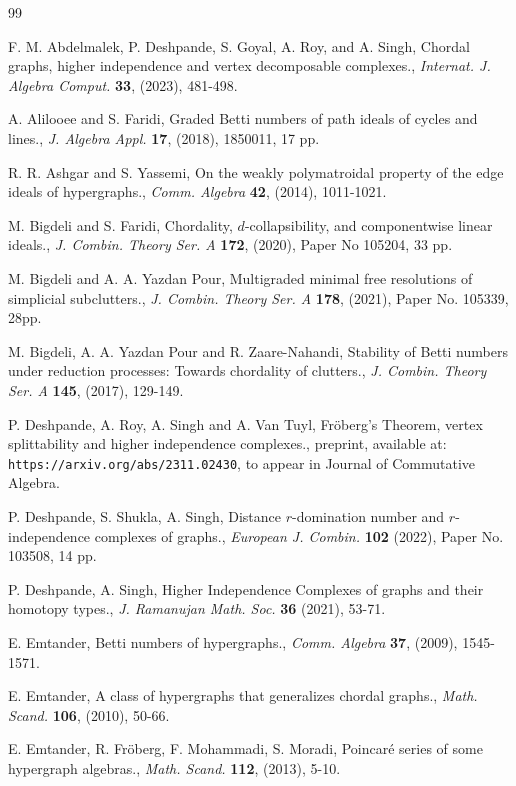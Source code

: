 \documentclass[12pt,reqno]{amsart}
\theoremstyle{definition}
\begin{document}
\begin{thebibliography}{99}

 F. M. Abdelmalek, P. Deshpande, S. Goyal, A. Roy, and A. Singh, Chordal graphs, higher independence and vertex decomposable complexes., \emph{Internat. J. Algebra Comput.} {\bf 33}, (2023), 481-498.

 A. Alilooee and S. Faridi, Graded Betti numbers of path ideals of cycles and lines., \emph{J. Algebra Appl.} {\bf 17}, (2018), 1850011, 17 pp.

 R. R. Ashgar and S. Yassemi, On the weakly polymatroidal property of the edge ideals of
hypergraphs., \emph{Comm. Algebra} {\bf 42}, (2014), 1011-1021.

 M. Bigdeli and S. Faridi, Chordality, {$d$}-collapsibility, and componentwise linear ideals., \emph{J. Combin. Theory Ser. A} {\bf 172}, (2020), Paper No 105204, 33 pp.

 M. Bigdeli and A. A. Yazdan Pour, Multigraded minimal free resolutions of simplicial subclutters., \emph{J. Combin. Theory Ser. A} {\bf 178}, (2021), Paper No. 105339, 28pp.

  M. Bigdeli, A. A. Yazdan Pour and R. Zaare-Nahandi, Stability of Betti numbers under reduction processes: Towards chordality of clutters., \emph{J. Combin. Theory Ser. A} {\bf 145}, (2017), 129-149.

 P. Deshpande, A. Roy, A. Singh and A. Van Tuyl, Fr\"oberg's Theorem, vertex splittability and higher independence complexes., preprint, available at: {\tt https://arxiv.org/abs/2311.02430}, to appear in Journal of Commutative Algebra.

P. Deshpande, S. Shukla, A. Singh,
Distance $r$-domination number and $r$-independence complexes of graphs., \emph{European J. Combin.} {\bf 102}
(2022), Paper No. 103508, 14 pp.

P. Deshpande, A. Singh,
Higher Independence Complexes of graphs and their homotopy types., \emph{J. Ramanujan Math. Soc.} {\bf 36} (2021), 53-71.

 E. Emtander, Betti numbers of hypergraphs., \emph{Comm. Algebra} {\bf 37}, (2009), 1545-1571.

 E. Emtander, A class of hypergraphs that generalizes chordal graphs., \emph{Math. Scand.} {\bf 106}, (2010), 50-66.

 E. Emtander, R. Fr\"oberg, F. Mohammadi, S. Moradi, Poincaré series of some hypergraph algebras., \emph{Math. Scand.} {\bf 112}, (2013), 5-10.


\end{thebibliography}
\end{document}
